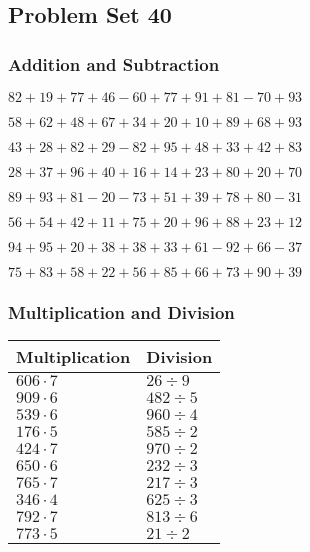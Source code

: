 \hypertarget{problem-set-40}{%
\subsection{Problem Set 40}\label{problem-set-40}}

\hypertarget{addition-and-subtraction}{%
\subsubsection{Addition and
Subtraction}\label{addition-and-subtraction}}

\(82+19+77+46-60+77+91+81-70+93\)

\(58+62+48+67+34+20+10+89+68+93\)

\(43+28+82+29-82+95+48+33+42+83\)

\(28+37+96+40+16+14+23+80+20+70\)

\(89+93+81-20-73+51+39+78+80-31\)

\(56+54+42+11+75+20+96+88+23+12\)

\(94+95+20+38+38+33+61-92+66-37\)

\(75+83+58+22+56+85+66+73+90+39\)

\hypertarget{multiplication-and-division}{%
\subsubsection{Multiplication and
Division}\label{multiplication-and-division}}

\begin{longtable}[]{@{}ll@{}}
\toprule
Multiplication & Division\tabularnewline
\midrule
\endhead
\(606\cdot7\) & \(26÷9\)\tabularnewline
\(909\cdot6\) & \(482÷5\)\tabularnewline
\(539\cdot6\) & \(960÷4\)\tabularnewline
\(176\cdot5\) & \(585÷2\)\tabularnewline
\(424\cdot7\) & \(970÷2\)\tabularnewline
\(650\cdot6\) & \(232÷3\)\tabularnewline
\(765\cdot7\) & \(217÷3\)\tabularnewline
\(346\cdot4\) & \(625÷3\)\tabularnewline
\(792\cdot7\) & \(813÷6\)\tabularnewline
\(773\cdot5\) & \(21÷2\)\tabularnewline
\bottomrule
\end{longtable}
